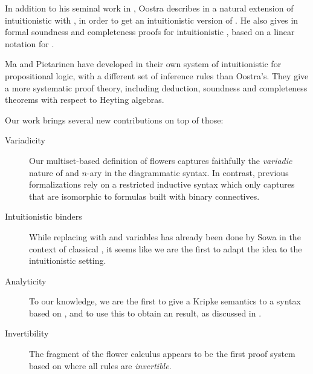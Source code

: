 \begin{scope}
In addition to his seminal work in \cite{oostra_graficos_2011}, Oostra describes
in  a natural extension of intuitionistic
 with , in order to get an intuitionistic version of
. He also gives in \cite{10.1007/978-3-030-86062-2_16} formal soundness
and completeness proofs for intuitionistic , based on a linear
notation for .

Ma and Pietarinen have developed in \cite{minghui_graphical_2019} their own
system of intuitionistic  for propositional logic, with a different set
of inference rules than Oostra's. They give a more systematic proof theory,
including deduction, soundness and completeness theorems with respect to Heyting
algebras.

Our work brings several new contributions on top of those:
\begin{description}
  \item[Variadicity] Our multiset-based definition of flowers captures
  faithfully the \emph{variadic} nature of  and $n$-ary
   in the diagrammatic syntax. In contrast, previous formalizations
  rely on a restricted inductive syntax which only captures  that are
  isomorphic to formulas built with binary connectives.

  \item[Intuitionistic binders] While replacing  with 
  and variables has already been done by Sowa in the context of classical 
  \cite{sowa_peirces_2011}, it seems like we are the first to adapt the idea to
  the intuitionistic setting.

  \item[Analyticity] To our knowledge, we are the first to give a Kripke
  semantics to a syntax based on , and to use this to obtain an
   result, as discussed in .  

  \item[Invertibility] The  fragment of the flower calculus appears
  to be the first proof system based on  where all rules are
  \emph{invertible}.
\end{description}


\end{scope}
